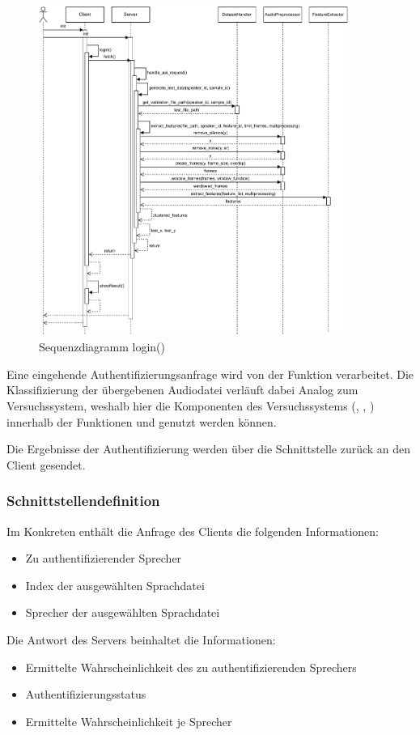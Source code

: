 \begin{figure}[H]
    \centering
    \includegraphics[width=0.9\textwidth, keepaspectratio]{images/SequenzdiagrammClientServer}
    \caption{Sequenzdiagramm login()}
    \label{fig:SequenceHandleApiRequest}
\end{figure}

Eine eingehende Authentifizierungsanfrage wird von der Funktion  verarbeitet.
Die Klassifizierung der übergebenen Audiodatei verläuft dabei Analog zum Versuchssystem, weshalb hier die Komponenten des Versuchssystems (, , ) innerhalb der Funktionen  und  genutzt werden können. %

Die Ergebnisse der Authentifizierung werden über die Schnittstelle zurück an den Client gesendet.

\subsubsection{Schnittstellendefinition}
Im Konkreten enthält die Anfrage des Clients die folgenden Informationen:
\begin{itemize}
    \item Zu authentifizierender Sprecher
    \item Index der ausgewählten Sprachdatei
    \item Sprecher der ausgewählten Sprachdatei
\end{itemize}
Die Antwort des Servers beinhaltet die Informationen:
\begin{itemize}
    \item Ermittelte Wahrscheinlichkeit des zu authentifizierenden Sprechers
    \item Authentifizierungsstatus
    \item Ermittelte Wahrscheinlichkeit je Sprecher
\end{itemize}
